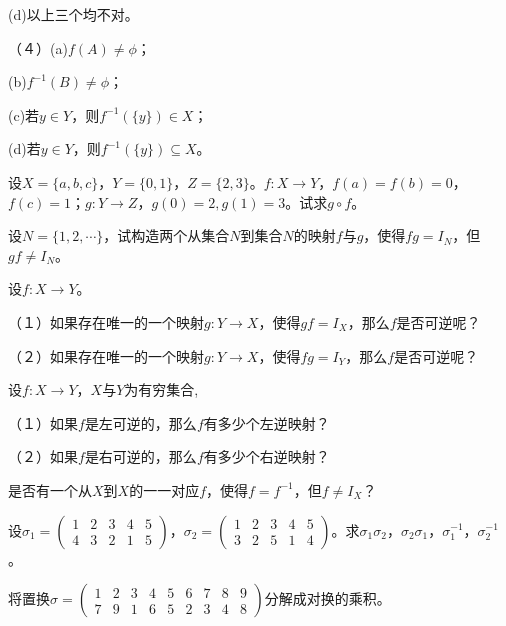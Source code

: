 \documentclass{article}
\begin{document}
\begin{CJK}{UTF8}{gbsn}
\begin{Exercise}
  (d)以上三个均不对。

  （４）(a)$f(A)\neq \phi$；

  (b)$f^{-1}(B) \neq \phi$；

  (c)若$y\in Y$，则$f^{-1}(\{y\})\in X$；

  (d)若$y\in Y$，则$f^{-1}(\{y\})\subseteq X$。
\end{Exercise}
\begin{Exercise}
  设$X=\{a,b,c\}$，$Y=\{0,1\}$，$Z=\{2,3\}$。$f:X\to Y$，$f(a)=f(b)=0$，$f(c)=1$；$g:Y\to Z$，$g(0)=2,g(1)=3$。试求$g\circ f$。
\end{Exercise}
\vspace{10cm}
\begin{Exercise}
  设$N=\{1,2,\cdots\}$，试构造两个从集合$N$到集合$N$的映射$f$与$g$，使得$fg=I_N$，但$gf\neq I_N$。
\end{Exercise}
\vspace{10cm}
\begin{Exercise}
设$f:X\to Y$。

（１）如果存在唯一的一个映射$g:Y\to X$，使得$gf=I_X$，那么$f$是否可逆呢？

（２）如果存在唯一的一个映射$g:Y\to X$，使得$fg=I_Y$，那么$f$是否可逆呢？
\end{Exercise}
\vspace{10cm}
\begin{Exercise}
设$f:X\to Y$，$X$与$Y$为有穷集合,

（１）如果$f$是左可逆的，那么$f$有多少个左逆映射？

（２）如果$f$是右可逆的，那么$f$有多少个右逆映射？
\end{Exercise}
\vspace{10cm}
\begin{Exercise}
是否有一个从$X$到$X$的一一对应$f$，使得$f=f^{-1}$，但$f\neq I_X$？
\end{Exercise}
\vspace{5cm}
\begin{Exercise}
 设$\sigma_1=\begin{pmatrix}1&2&3&4&5\\4&3&2&1&5\end{pmatrix}$，$\sigma_2=\begin{pmatrix}1&2&3&4&5\\3&2&5&1&4\end{pmatrix}$。求$\sigma_1\sigma_2$，$\sigma_2\sigma_1$，$\sigma_1^{-1}$，$\sigma_2^{-1}$。
\end{Exercise}
\vspace{10cm}
\begin{Exercise}
  将置换$\sigma=\begin{pmatrix}1&2&3&4&5&6&7&8&9\\7&9&1&6&5&2&3&4&8\end{pmatrix}$分解成对换的乘积。
\end{Exercise}



\end{CJK}
\end{document}
